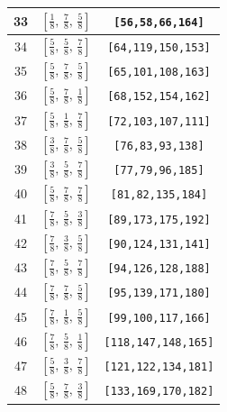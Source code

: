 \documentclass[fleqn,8pt]{jsarticle}
\begin{document}
\begin{longtable}{ccc}
33 & $\left[ \frac{1}{8},\, \frac{7}{8},\, \frac{5}{8} \right]$ & {\tt [56,58,66,164]} \\ \hline
34 & $\left[ \frac{5}{8},\, \frac{5}{8},\, \frac{7}{8} \right]$ & {\tt [64,119,150,153]} \\ \hline
35 & $\left[ \frac{5}{8},\, \frac{7}{8},\, \frac{5}{8} \right]$ & {\tt [65,101,108,163]} \\ \hline
36 & $\left[ \frac{5}{8},\, \frac{7}{8},\, \frac{1}{8} \right]$ & {\tt [68,152,154,162]} \\ \hline
37 & $\left[ \frac{5}{8},\, \frac{1}{8},\, \frac{7}{8} \right]$ & {\tt [72,103,107,111]} \\ \hline
38 & $\left[ \frac{3}{8},\, \frac{7}{8},\, \frac{5}{8} \right]$ & {\tt [76,83,93,138]} \\ \hline
39 & $\left[ \frac{3}{8},\, \frac{5}{8},\, \frac{7}{8} \right]$ & {\tt [77,79,96,185]} \\ \hline
40 & $\left[ \frac{5}{8},\, \frac{7}{8},\, \frac{7}{8} \right]$ & {\tt [81,82,135,184]} \\ \hline
41 & $\left[ \frac{7}{8},\, \frac{5}{8},\, \frac{3}{8} \right]$ & {\tt [89,173,175,192]} \\ \hline
42 & $\left[ \frac{7}{8},\, \frac{3}{8},\, \frac{5}{8} \right]$ & {\tt [90,124,131,141]} \\ \hline
43 & $\left[ \frac{7}{8},\, \frac{5}{8},\, \frac{7}{8} \right]$ & {\tt [94,126,128,188]} \\ \hline
44 & $\left[ \frac{7}{8},\, \frac{7}{8},\, \frac{5}{8} \right]$ & {\tt [95,139,171,180]} \\ \hline
45 & $\left[ \frac{7}{8},\, \frac{1}{8},\, \frac{5}{8} \right]$ & {\tt [99,100,117,166]} \\ \hline
46 & $\left[ \frac{7}{8},\, \frac{5}{8},\, \frac{1}{8} \right]$ & {\tt [118,147,148,165]} \\ \hline
47 & $\left[ \frac{5}{8},\, \frac{3}{8},\, \frac{7}{8} \right]$ & {\tt [121,122,134,181]} \\ \hline
48 & $\left[ \frac{5}{8},\, \frac{7}{8},\, \frac{3}{8} \right]$ & {\tt [133,169,170,182]} \\
\end{longtable}
\renewcommand{\arraystretch}{1.2}
\end{document}
